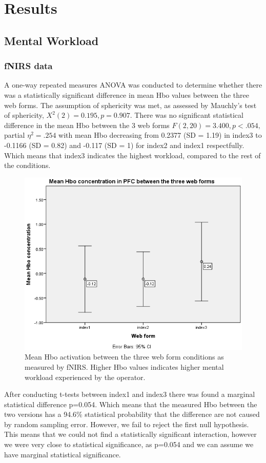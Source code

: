 \documentclass[a4paper]{report}
\begin{document}
	\section{Results}
		\subsection{Mental Workload}
			\subsubsection{fNIRS data}
			A one-way repeated measures ANOVA was conducted to determine whether there was a statistically significant difference in mean Hbo values between the three web forms. The assumption of sphericity was met, as assessed by Mauchly's test of sphericity, $X^{2}(2) = 0.195, p = 0.907$. There was no significant statistical difference in the mean Hbo between the 3 web forms  $F(2,20)=3.400, p<.054,$ partial $\eta^{2}=.254$ with mean Hbo decreasing from 0.2377 (SD = 1.19) in index3 to -0.1166 (SD = 0.82) and -0.117 (SD = 1) for index2 and index1 respectfully. Which means that index3 indicates the highest workload, compared to the rest of the conditions.
			\begin{figure}[h]
				\centering
				\includegraphics[width=0.7\linewidth]{mean-hbo-index123}
				\caption[mean Hbo activation between the three web forms]{Mean Hbo activation between the three web form conditions as measured by fNIRS. Higher Hbo values indicates higher mental workload experienced by the operator.}
				\label{fig:mean-hbo-index123}
			\end{figure}
			After conducting t-tests between index1 and index3 there was found a marginal statistical difference p=0.054. Which means that the measured Hbo between the two versions has a 94.6\% statistical probability that the difference are not caused by random sampling error. However, we fail to reject the first null hypothesis. This means that we could not find a statistically significant interaction, however we were very close to statistical significance, as p=0.054 and we can assume we have marginal statistical significance.
	
\end{document}
